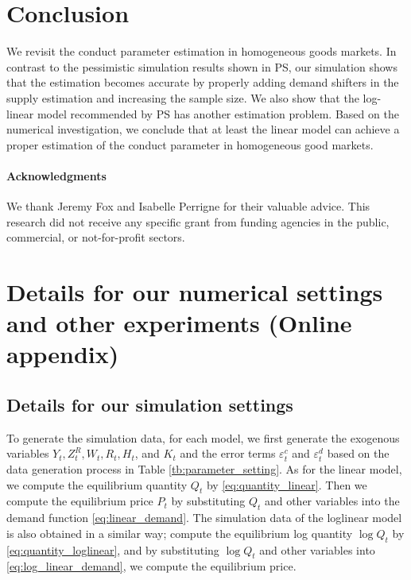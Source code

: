 \documentclass[11pt, a4paper]{article}
\begin{document}


\section{Conclusion}
We revisit the conduct parameter estimation in homogeneous goods markets. In contrast to the pessimistic simulation results shown in PS, our simulation shows that the estimation becomes accurate by properly adding demand shifters in the supply estimation and increasing the sample size. We also show that the log-linear model recommended by PS has another estimation problem. Based on the numerical investigation, we conclude that at least the linear model can achieve a proper estimation of the conduct parameter in homogeneous good markets.

\paragraph{Acknowledgments}
We thank Jeremy Fox and Isabelle Perrigne for their valuable advice. This research did not receive any specific grant from funding agencies in the public, commercial, or not-for-profit sectors. 




\newpage
\appendix

\section{Details for our numerical settings and other experiments (Online appendix)}\label{sec:appendix}

\subsection{Details for our simulation settings}

To generate the simulation data, for each model, we first generate the exogenous variables $Y_t, Z_t^R, W_t, R_t, H_t$, and $K_t$ and the error terms $\varepsilon_{t}^c$ and $\varepsilon_{t}^d$ based on the data generation process in Table \ref{tb:parameter_setting}.
As for the linear model, we compute the equilibrium quantity $Q_t$ by \eqref{eq:quantity_linear}.
Then we compute the equilibrium price $P_t$ by substituting $Q_t$ and other variables into the demand function \eqref{eq:linear_demand}.
The simulation data of the loglinear model is also obtained in a similar way; compute the equilibrium log quantity $\log Q_t$ by \eqref{eq:quantity_loglinear}, and by substituting $\log Q_t$ and other variables into \eqref{eq:log_linear_demand}, we compute the equilibrium price.
\end{document}
